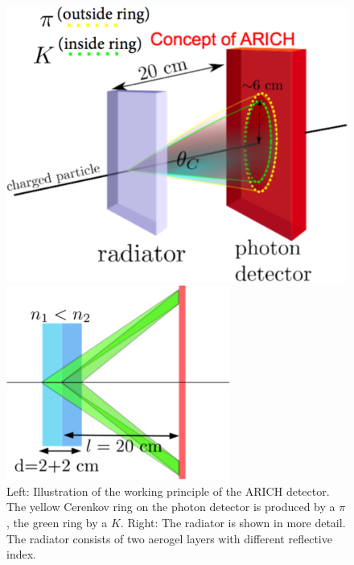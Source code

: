 \documentclass[a4paper,11pt,twosided,final,german,openbib,pdftex,listof=totoc,bibliography=totoc]{scrbook}
\begin{document}
\begin{figure}[h!]
	\centering
\begin{minipage}[b]{0.45\linewidth}
	\centering
	\includegraphics[width=\textwidth]{Bilder/ARICH}
\end{minipage}
\hspace{0.5cm}
\begin{minipage}[b]{0.45\linewidth}
	\centering
	\includegraphics[width=\textwidth]{Bilder/ARICH2}
\end{minipage}

	\caption[ARICH]{Left: Illustration of the working principle of the ARICH detector. The yellow Cerenkov ring on the photon detector is produced by a $\pi$, the green ring by a $K$. Right: The radiator is shown in more detail. The radiator consists of two aerogel layers with different reflective index. \cite{TORASSA} }
\label{fig:ARICH}
\end{figure}
\end{document}
